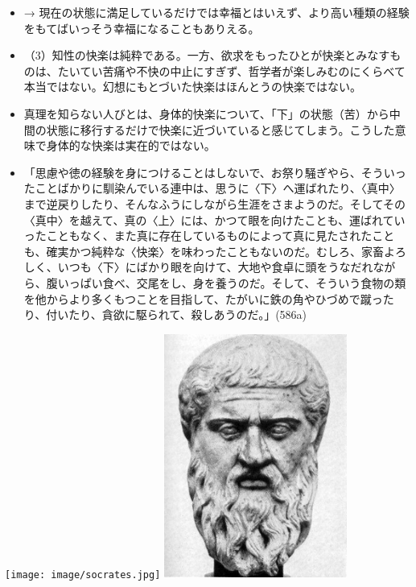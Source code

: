 \documentclass[dvipdfmx]{jsarticle}
\begin{document}
\begin{itemize}
\item → 現在の状態に満足しているだけでは幸福とはいえず、より高い種類の経験をもてばいっそう幸福になることもありえる。

\item （3）知性の快楽は純粋である。一方、欲求をもったひとが快楽とみなすものは、たいてい苦痛や不快の中止にすぎず、哲学者が楽しみむのにくらべて本当ではない。幻想にもとづいた快楽はほんとうの快楽ではない。

\item 真理を知らない人びとは、身体的快楽について、「下」の状態（苦）から中間の状態に移行するだけで快楽に近づいていると感じてしまう。こうした意味で身体的な快楽は実在的ではない。

\item 「思慮や徳の経験を身につけることはしないで、お祭り騒ぎやら、そういったことばかりに馴染んでいる連中は、思うに〈下〉へ運ばれたり、〈真中〉まで逆戻りしたり、そんなふうにしながら生涯をさまようのだ。そしてその〈真中〉を越えて、真の〈上〉には、かつて眼を向けたことも、運ばれていったこともなく、また真に存在しているものによって真に見たされたことも、確実かつ純粋な〈快楽〉を味わったこともないのだ。むしろ、家畜よろしく、いつも〈下〉にばかり眼を向けて、大地や食卓に頭をうなだれながら、腹いっぱい食べ、交尾をし、身を養うのだ。そして、そういう食物の類を他からより多くもつことを目指して、たがいに鉄の角やひづめで蹴ったり、付いたり、貪欲に駆られて、殺しあうのだ。」(586a)

\end{itemize}


\nocite{プラトン田中66:国家}
\nocite{プラトン藤沢66:ゴルギアス}
\nocite{norman98:_moral_philos}
\nocite{macintyre67:_short_histor_of_ethic}
  


\texttt{[image: image/socrates.jpg]}
\includegraphics[width=60mm]{images/plato.jpg}
\end{document}

